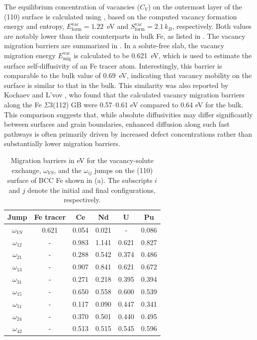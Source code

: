 \documentclass[preprint,12pt]{elsarticle}
\begin{document}
The equilibrium concentration of vacancies (\( C_V \)) on the outermost layer of the (110) surface is calculated using , based on the computed vacancy formation energy and entropy, \( E_{\text{form}}^{\text{vac}} = 1.22 \)~eV and \( S_{\text{form}}^{\text{vac}} = 2.1\,k_B \), respectively. Both values are notably lower than their counterparts in bulk Fe, as listed in . The vacancy migration barriers are summarized in . In a solute-free slab, the vacancy migration energy \( E_{\text{mig}}^{\text{vac}} \) is calculated to be 0.621~eV, which is used to estimate the surface self-diffusivity of an Fe tracer atom. Interestingly, this barrier is comparable to the bulk value of 0.69~eV, indicating that vacancy mobility on the surface is similar to that in the bulk. This similarity was also reported by Kochaev and L'vov \cite{kochaev2024atomistic}, who found that the calculated vacancy migration barriers along the Fe $\Sigma3$(112) GB were 0.57–0.61 eV compared to 0.64 eV for the bulk. This comparison suggests that, while absolute diffusivities may differ significantly between surfaces and grain boundaries, enhanced diffusion along such fast pathways is often primarily driven by increased defect concentrations rather than substantially lower migration barriers.


\begin{table}[!ht]
    \centering
    \caption{Migration barriers in eV for the vacancy-solute exchange, $\omega_{VS}$, and the $\omega_{ij}$ jumps on the (110) surface of BCC Fe shown in (a). The subscripts $i$ and $j$ denote the initial and final configurations, respectively. }
    \begin{tabular}{|c|c|c|c|c|c|}
      \hline
      Jump &Fe tracer& Ce & Nd & U & Pu \\
      \hline
      $\omega_{VS}$&0.621&0.054 &0.021 &- &0.086  \\
      \hline
      $\omega_{12}$&-&0.983 &1.141 &0.621 &0.827 \\
      $\omega_{21}$&-&0.288 &0.542 &0.374 &0.486 \\
      \hline
      $\omega_{13}$&-&0.907 &0.841 &0.621 &0.672 \\
      $\omega_{31}$&-&0.271 &0.218 &0.395 &0.394 \\
      \hline
      $\omega_{15}$&-&0.650 &0.558 &0.600 &0.539 \\
      $\omega_{51}$&-&0.117 &0.090 &0.447 &0.341 \\ 
      \hline
      $\omega_{24}$&-&0.370 &0.501 &0.440 &0.495 \\
      $\omega_{42}$&-&0.513 &0.515 &0.545 &0.596 \\
      \hline
    \end{tabular}
    \label{tab:mig_barriers_surface}
\end{table}
\end{document}
